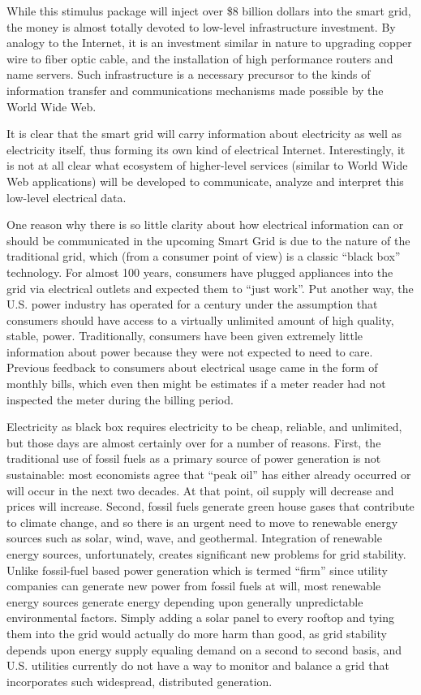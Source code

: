 While this stimulus package will inject over \$8 billion dollars into the
smart grid, the money is almost totally devoted to low-level infrastructure
investment.  By analogy to the Internet, it is an investment similar in
nature to upgrading copper wire to fiber optic cable, and the installation
of high performance routers and name servers.  Such infrastructure is a
necessary precursor to the kinds of information transfer and communications
mechanisms made possible by the World Wide Web.

It is clear that the smart grid will carry information about electricity as
well as electricity itself, thus forming its own kind of electrical
Internet. Interestingly, it is not at all clear what ecosystem of
higher-level services (similar to World Wide Web applications) will be
developed to communicate, analyze and interpret this low-level electrical
data.

One reason why there is so little clarity about how electrical information
can or should be communicated in the upcoming Smart Grid is due to the
nature of the traditional grid, which (from a consumer point of view) is a
classic ``black box'' technology.  For almost 100 years, consumers have
plugged appliances into the grid via electrical outlets and expected them
to ``just work''.  Put another way, the U.S. power industry has operated
for a century under the assumption that consumers should have access to a
virtually unlimited amount of high quality, stable, power.  Traditionally,
consumers have been given extremely little information about power because
they were not expected to need to care.  Previous feedback to consumers
about electrical usage came in the form of monthly bills, which even then
might be estimates if a meter reader had not inspected the meter during the
billing period.

Electricity as black box requires electricity to be cheap, reliable, and
unlimited, but those days are almost certainly over for a number of
reasons.  First, the traditional use of fossil fuels as a primary source of
power generation is not sustainable: most economists agree that ``peak
oil'' has either already occurred or will occur in the next two decades. At
that point, oil supply will decrease and prices will increase.  Second,
fossil fuels generate green house gases that contribute to climate change,
and so there is an urgent need to move to renewable energy sources such as
solar, wind, wave, and geothermal.  Integration of renewable energy
sources, unfortunately, creates significant new problems for grid
stability.  Unlike fossil-fuel based power generation which is termed
``firm'' since utility companies can generate new power from fossil fuels
at will, most renewable energy sources generate energy depending upon
generally unpredictable environmental factors.  Simply adding a solar panel
to every rooftop and tying them into the grid would actually do more harm
than good, as grid stability depends upon energy supply equaling demand on
a second to second basis, and U.S. utilities currently do not have a way to
monitor and balance a grid that incorporates such widespread, distributed
generation.

